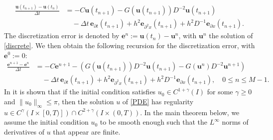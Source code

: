 \documentclass{siamltex}
\newcommand{\be}{\mathbf e}
\newcommand{\bu}{\mathbf u}
\begin{document}
{\begin{equation}
\begin{split}
 \frac{\bu(t_{n+1})- \bu(t_n)}{\Delta t}  & = - C \bu(t_{n+1}) - G(\bu(t_{n+1}))D^{-2}\bu(t_{n+1})  \\  & \quad  -\Delta t \,\be_{\partial t}(t_{n+1}) +   h^2 \be_{\partial^2 x}(t_{n+1})+h^2 D^{-1}\be_{\partial x}(t_{n+1}) .
 \end{split}
\end{equation}
The discretization error is denoted by $\be^n:=\bu(t_n)-\bu^n$, with $\bu^n$ the solution  of \eqref{discrete}. We then obtain the following recursion for the discretization error, with $\be^0:=0$:
\begin{equation} \label{erreq2} \begin{split}
 \frac{\be^{n+1}- \be^n}{\Delta t}  & = - C\be^{n+1} - \left(G(\bu(t_{n+1}))D^{-2}\bu(t_{n+1})- G(\bu^n)D^{-2}\bu^{n+1}\right)  \\  & \quad  -\Delta t \,\be_{\partial t}(t_{n+1}) +   h^2 \be_{\partial^2 x}(t_{n+1})+h^2 D^{-1}\be_{\partial x}(t_{n+1}), \quad 0 \leq n \leq M-1.
 \end{split}
\end{equation}
 In \cite{Chang1991} it is shown that if the initial condition satisfies $u_0 \in C^{1+\gamma}(I)$ for some $\gamma\geq 0$ and $\|u_0\|_\infty \leq \pi$, then the solution $u$ of \eqref{PDE} has  regularity $u \in C^\gamma(I\times [0,T)])\cap C^{2+\gamma}(I\times (0,T))$. In the main theorem below, we assume the initial condition $u_0$ to be smooth enough such that the $L^\infty$ norms of derivatives of $u$ that appear are finite. 

}
\end{document}

